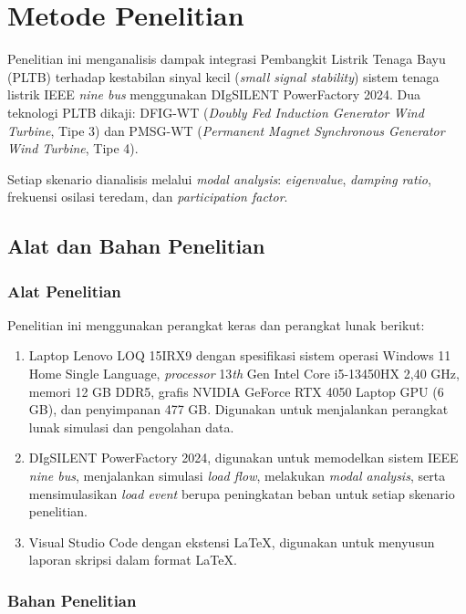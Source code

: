 \chapter{Metode Penelitian}

Penelitian ini menganalisis dampak integrasi Pembangkit Listrik Tenaga Bayu
(PLTB) terhadap kestabilan sinyal kecil (\textit{small signal stability}) sistem
tenaga listrik IEEE \textit{nine bus} menggunakan DIgSILENT PowerFactory 2024.
Dua teknologi PLTB dikaji: DFIG-WT (\textit{Doubly Fed Induction Generator Wind
Turbine}, Tipe 3) dan PMSG-WT (\textit{Permanent Magnet Synchronous Generator
Wind Turbine}, Tipe 4).

Setiap skenario dianalisis melalui \textit{modal analysis}: \textit{eigenvalue}, \textit{damping ratio}, frekuensi osilasi teredam, dan \textit{participation factor}.

\section{Alat dan Bahan Penelitian}

\subsection{Alat Penelitian}

Penelitian ini menggunakan perangkat keras dan perangkat lunak berikut:

\begin{enumerate}
    \item Laptop Lenovo LOQ 15IRX9 dengan spesifikasi sistem operasi Windows 11
    Home Single Language, \textit{processor} 13\textit{th} Gen
    Intel\textregistered{} Core\texttrademark{} i5-13450HX 2,40 GHz, memori 12
    GB DDR5, grafis NVIDIA GeForce RTX 4050 Laptop GPU (6 GB), dan penyimpanan
    477 GB. Digunakan untuk menjalankan perangkat lunak simulasi dan pengolahan
    data.
    \item DIgSILENT PowerFactory 2024, digunakan untuk memodelkan sistem IEEE
    \textit{nine bus}, menjalankan simulasi \textit{load flow}, melakukan
    \textit{modal analysis}, serta mensimulasikan \textit{load event} berupa
    peningkatan beban untuk setiap skenario penelitian.
    \item Visual Studio Code dengan ekstensi \LaTeX{}, digunakan untuk menyusun
    laporan skripsi dalam format \LaTeX{}.
\end{enumerate}

\subsection{Bahan Penelitian}


